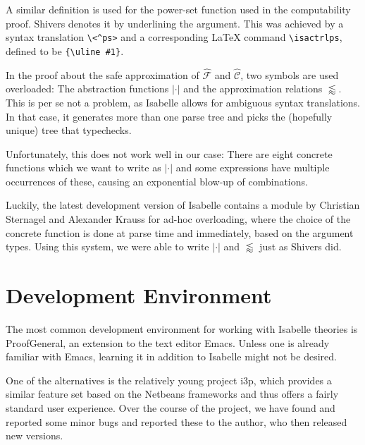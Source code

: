 \documentclass[a4paper,parskip=half,BCOR=8mm,DIV=calc,12pt]{scrbook}
\newcommand{\aC}{\widehat{\mathcal C}}
\newcommand{\aF}{\widehat{\mathcal F}}
\begin{document}
A similar definition is used for the power-set function used in the computability proof. Shivers denotes it by underlining the argument. This was achieved by a syntax translation \texttt{\textbackslash <\^{}ps>} and a corresponding \LaTeX{} command \texttt{\textbackslash isactrlps}, defined to be \texttt{\{\textbackslash uline \#1\}}.

In the proof about the safe approximation of $\aF$ and $\aC$, two symbols are used overloaded: The abstraction functions $|\cdot|$ and the approximation relations $\lessapprox$. This is per se not a problem, as Isabelle allows for ambiguous syntax translations. In that case, it generates more than one parse tree and picks the (hopefully unique) tree that typechecks.

Unfortunately, this does not work well in our case: There are eight concrete functions which we want to write as $|\cdot|$ and some expressions have multiple occurrences of these, causing an exponential blow-up of combinations.

Luckily, the latest development version of Isabelle contains a module by Christian Sternagel and Alexander Krauss for ad-hoc overloading, where the choice of the concrete function is done at parse time and immediately, based on the argument types. Using this system, we were able to write $|\cdot|$ and $\lessapprox$ just as Shivers did.

\section{Development Environment}

The most common development environment for working with Isabelle theories is ProofGeneral, an extension to the text editor Emacs. 
Unless one is already familiar with Emacs, learning it in addition to Isabelle might not be desired.

One of the alternatives is the relatively young project i3p\citep{i3p}, which provides a similar feature set based on the Netbeans frameworks and thus offers a fairly standard user experience. Over the course of the project, we have found and reported some minor bugs and reported these to the author, who then released new versions.
\end{document}
